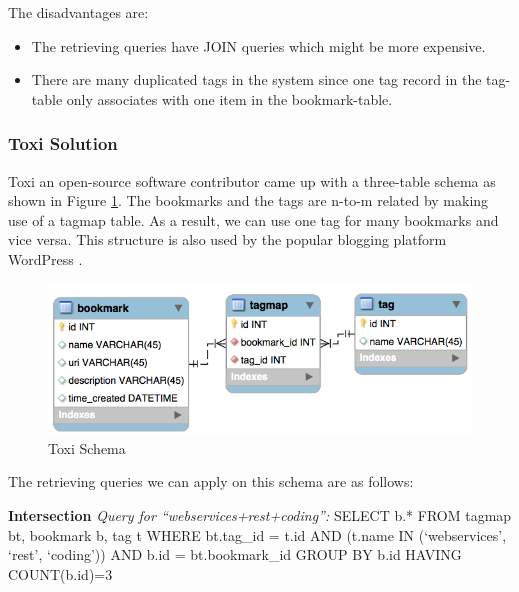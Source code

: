 The disadvantages are:
\begin{itemize}
   \item The retrieving queries have JOIN queries which might be more expensive.
   \item There are many duplicated tags in the system since one tag record in the tag-table only associates with one item in the bookmark-table.
\end{itemize}

\subsubsection{Toxi Solution}
Toxi \cite{toxi} an open-source software contributor came up with a three-table schema as shown in Figure \ref{fg:toxi}. The bookmarks and the tags are n-to-m related by making use of a tagmap table. As a result, we can use one tag for many bookmarks and vice versa. This structure is also used by the popular blogging platform WordPress \cite{wordpress}.

\begin{figure}[!h]
\begin{centering}
\includegraphics[scale=0.65]{pics/toxi}
\caption{Toxi Schema}\label{fg:toxi}
\end{centering}
\end{figure}

The retrieving queries we can apply on this schema are as follows:

\textbf{Intersection}\newline
\textit{Query for ``webservices+rest+coding'':}\newline\newline
SELECT b.*\newline
FROM tagmap bt, bookmark b, tag t\newline
WHERE bt.tag\_id = t.id\newline
AND (t.name IN (`webservices', `rest', `coding'))\newline
AND b.id = bt.bookmark\_id\newline
GROUP BY b.id\newline
HAVING COUNT(b.id)=3

